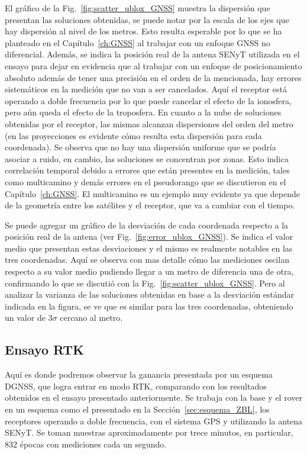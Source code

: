 \documentclass[a4paper,12pt,oneside,onecolumn,final,openright]{book}%
\begin{document}
	El gráfico de la Fig.~\ref{fig:scatter_ublox_GNSS} muestra la dispersión que presentan las soluciones obtenidas, se puede notar por la escala de los ejes que hay dispersión al nivel de los metros. Esto resulta esperable por lo que se ha planteado en el Capítulo~\ref{ch:GNSS} al trabajar con un enfoque GNSS no diferencial. Además, se indica la posición real de la antena SENyT utilizada en el ensayo para dejar en evidencia que al trabajar con un enfoque de posicionamiento absoluto además de tener una precisión en el orden de la mencionada, hay errores sistemáticos en la medición que no van a ser cancelados. Aquí el receptor está operando a doble frecuencia por lo que puede cancelar el efecto de la ionosfera, pero aún queda el efecto de la troposfera. En cuanto a la nube de soluciones obtenidas por el receptor, las mismas alcanzan dispersiones del orden del metro (en las proyecciones es evidente cómo resulta esta dispersión para cada coordenada). Se observa que no hay una dispersión uniforme que se podría asociar a ruido, en cambio, las soluciones se concentran por zonas. Esto indica correlación temporal debido a errores que están presentes en la medición, tales como multicamino y demás errores en el pseudorango que se discutieron en el Capítulo~\ref{ch:GNSS}. El multicamino es un ejemplo muy evidente ya que depende de la geometría entre los satélites y el receptor, que va a cambiar con el tiempo.
	
	 Se puede agregar un gráfico de la desviación de cada coordenada respecto a la posición real de la antena (ver Fig.~\ref{fig:error_ublox_GNSS}). Se indica el valor medio que presentan estas desviaciones y el mismo es realmente notables en las tres coordenadas. Aquí se observa con mas detalle cómo las mediciones oscilan respecto a su valor medio pudiendo llegar a un metro de diferencia una de otra, confirmando lo que se discutió con la Fig.~\ref{fig:scatter_ublox_GNSS}. Pero al analizar la varianza de las soluciones obtenidas en base a la desviación estándar indicada en la figura, se ve que es similar para las tres coordenadas, obteniendo un valor de $3\sigma$ cercano al metro. 

\subsection{Ensayo RTK}\label{sec:RTK_ublox}
	Aquí es donde podremos observar la ganancia presentada por un esquema DGNSS, que logra entrar en modo RTK, comparando con los resultados obtenidos en el ensayo presentado anteriormente. Se trabaja con la base y el rover en un esquema como el presentado en la Sección~\ref{sec:esquema_ZBL}, los receptores operando a doble frecuencia, con el sistema GPS y utilizando la antena SENyT. Se toman muestras aproximadamente por trece minutos, en particular, 832 épocas con mediciones cada un segundo. 
	
\end{document}
